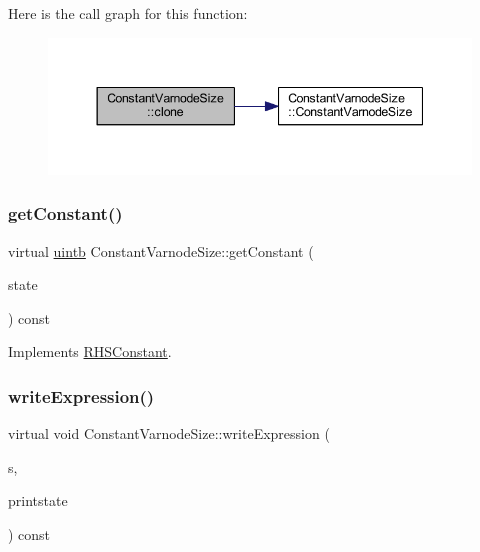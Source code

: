 Here is the call graph for this function\+:
\nopagebreak
\begin{figure}[H]
\begin{center}
\leavevmode
\includegraphics[width=344pt]{class_constant_varnode_size_ad8386fe9afbedfaa9fa8c17be0dd697c_cgraph}
\end{center}
\end{figure}
\mbox{\label{class_constant_varnode_size_a81d1d954be052fd603005228ff157add}} 
\subsubsection{\texorpdfstring{getConstant()}{getConstant()}}
{\footnotesize\ttfamily virtual \mbox{\hyperlink{types_8h_a2db313c5d32a12b01d26ac9b3bca178f}{uintb}} Constant\+Varnode\+Size\+::get\+Constant (\begin{DoxyParamCaption}\item[{\mbox{\hyperlink{class_unify_state}{Unify\+State}} \&}]{state }\end{DoxyParamCaption}) const\hspace{0.3cm}{\ttfamily [virtual]}}



Implements \mbox{\hyperlink{class_r_h_s_constant_a941b5d2898cbce985a3ef9c5db6fa458}{R\+H\+S\+Constant}}.

\mbox{\label{class_constant_varnode_size_a9541e1f66f85b1ae4f333fb45daa1b02}} 
\subsubsection{\texorpdfstring{writeExpression()}{writeExpression()}}
{\footnotesize\ttfamily virtual void Constant\+Varnode\+Size\+::write\+Expression (\begin{DoxyParamCaption}\item[{ostream \&}]{s,  }\item[{\mbox{\hyperlink{class_unify_c_printer}{Unify\+C\+Printer}} \&}]{printstate }\end{DoxyParamCaption}) const\hspace{0.3cm}{\ttfamily [virtual]}}



